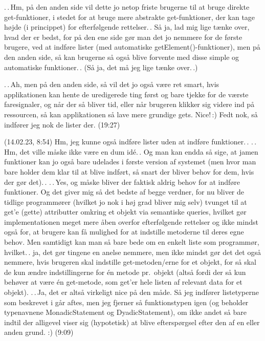 \documentclass{report}
\begin{document}
.\,.\,Hm, på den anden side vil dette jo netop friste brugerne til at bruge direkte get-funktioner, i stedet for at bruge mere abstrakte get-funktioner, der kan tage højde (i princippet) for efterfølgende rettelser.\,. Så ja, lad mig lige tænke over, hvad der er bedst, for på den ene side gør man det jo nemmere for de første brugere, ved at indføre lister (med automatiske getElement()-funktioner), men på den anden side, så kan brugerne så også blive forvente med disse simple og automatiske funktioner.\,. (Så ja, det må jeg lige tænke over.\,.) 

.\,.\,Ah, men på den anden side, så vil det jo også være ret smart, hvis applikationen kan hente de uredigerede ting først og bare tjekke for de værste faresignaler, og når der så bliver tid, eller når brugeren klikker sig videre ind på ressourcen, så kan applikationen så lave mere grundige gets. Nice!\,:) Fedt nok, så indfører jeg nok de lister der. (19:27)


(14.02.23, 8:54) Hm, jeg kunne også indføre lister uden at indføre funktioner.\,. .\,.\,Hm, det ville måske ikke være en dum idé.\,. Og man kan endda så sige, at jamen funktioner kan jo også bare udelades i første version af systemet (men hvor man bare holder dem klar til at blive indført, så snart der bliver behov for dem, hvis der gør det).\,. .\,.\,Yes, og måske bliver der faktisk aldrig behov for at indføre funktioner. Og det giver mig så det bedste af begge verdner, for nu bliver de tidlige programmører (hvilket jo nok i høj grad bliver mig selv) tvunget til at get'e (gette) attributter omkring et objekt via semantiske queries, hvilket gør implementationen meget mere åben overfor efterfølgende rettelser og ikke mindst også for, at brugere kan få mulighed for at indstille metoderne til deres egne behov. Men samtidigt kan man så bare bede om en enkelt liste som programmør, hvilket.\,. ja, det gør tingene en anelse nemmere, men ikke mindst gør det det også nemmere, hvis brugeren skal indstille get-metoden/erne for et objekt, for så skal de kun ændre indstillingerne for én metode pr.\ objekt (altså fordi der så kun behøver at være én get-metode, som get'er hele listen af relevant data for et objekt). .\,.\,Ja, det er altså virkeligt nice på den måde. Så jeg indfører listetyperne som beskrevet i går aftes, men jeg fjerner så funktionstypen igen (og beholder typenavnene MonadicStatement og DyadicStatement), om ikke andet så bare indtil der alligevel viser sig (hypotetisk) at blive efterspørgsel efter den af en eller anden grund. :) (9:09)
\end{document}
